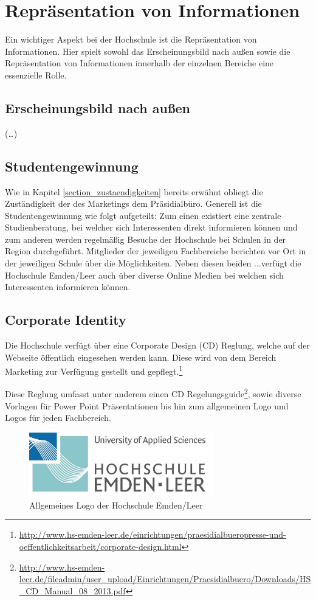 \section{Repräsentation von Informationen}
Ein wichtiger Aspekt bei der Hochschule ist die Repräsentation von Informationen. Hier spielt sowohl das Erscheinungsbild nach außen sowie die Repräsentation von Informationen innerhalb der einzelnen Bereiche eine essenzielle Rolle.

\subsection{Erscheinungsbild nach außen}
(\ldots)

\subsection{Studentengewinnung}
Wie in Kapitel \ref{section_zustaendigkeiten} bereits erwähnt obliegt die Zuständigkeit der des Marketings dem Präsidialbüro. Generell ist die Studentengewinnung wie folgt aufgeteilt:  Zum einen existiert eine zentrale Studienberatung, bei welcher sich Interessenten direkt informieren können und zum anderen werden regelmäßig Besuche der Hochschule bei Schulen in der Region durchgeführt. Mitglieder der jeweiligen Fachbereiche berichten vor Ort in der jeweiligen Schule über die Möglichkeiten. Neben diesen beiden ...verfügt die Hochschule Emden/Leer auch über diverse Online Medien bei welchen sich Interessenten informieren können.

\subsection{Corporate Identity}
Die Hochschule verfügt über eine Corporate Design (CD) Reglung, welche auf der Webseite öffentlich eingesehen werden kann. Diese wird von dem Bereich Marketing zur Verfügung gestellt und gepflegt.\footnote{\url{http://www.hs-emden-leer.de/einrichtungen/praesidialbueropresse-und-oeffentlichkeitsarbeit/corporate-design.html}}

Diese Reglung umfasst unter anderem einen CD Regelungsguide\footnote{\url{http://www.hs-emden-leer.de/fileadmin/user_upload/Einrichtungen/Praesidialbuero/Downloads/HS_CD_Manual_08_2013.pdf}}, sowie diverse Vorlagen für Power Point Präsentationen bis hin zum allgemeinen Logo und Logos für jeden Fachbereich.

\begin{figure}[h!]
	\centering
	\includegraphics[width=8cm]{kapitel/gruppe2/bilder/hs_logo_allgemein}
	\caption{Allgemeines Logo der Hochschule Emden/Leer}
	\label{fig_logo_allgemein}
\end{figure}

